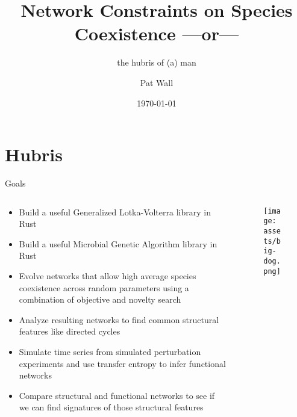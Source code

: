 \documentclass{cubeamer}
\title{Network Constraints on Species Coexistence ---or---}
\subtitle{the hubris of (a) man}
\author[Pat Wall]{Pat Wall}
\date{\today} %
\institute[Indiana University]
\begin{document}
\maketitle

\cutoc

\section{Hubris}

\begin{frame}{Goals}
    \begin{columns}
        \begin{column}{0.7\textwidth}
            \begin{itemize}
                \item Build a useful Generalized Lotka-Volterra library in Rust
                \item Build a useful Microbial Genetic Algorithm library in Rust
                \item Evolve networks that allow high average species coexistence across random parameters using a combination of objective and novelty search
                \item Analyze resulting networks to find common structural features like directed cycles
                \item Simulate time series from simulated perturbation experiments and use transfer entropy to infer functional networks
                \item Compare structural and functional networks to see if we can find signatures of those structural features
            \end{itemize}
        \end{column}
        \begin{column}{0.3\textwidth}
            \begin{figure*}
                \texttt{[image: assets/big-dog.png]}
            \end{figure*}
        \end{column}
    \end{columns}
\end{frame}
\end{document}
